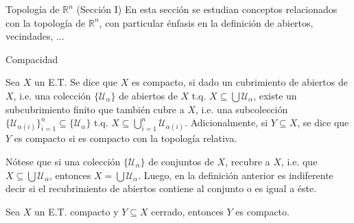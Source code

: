 \begin{chapter}{Topología de $\mathbb{R}^n$ (Sección I)}
En esta sección se estudian conceptos relacionados con la topología de $\mathbb{R}^n$, con particular énfasis en la definición de abiertos, vecindades, ...
\begin{section}{Compacidad}
\begin{defn}
Sea $X$ un E.T. Se dice que $X$ es compacto, si dado un cubrimiento de abiertos de $X$, i.e. una colección $\{\mathcal{U}_\alpha\}$ de abiertos de $X$ t.q. $X\subseteq\bigcup\mathcal{U}_\alpha$, existe un subcubrimiento finito que también cubre a $X$, i.e. una subcolección $\{\mathcal{U}_{\alpha(i)}\}_{i=1}^n\subseteq\{\mathcal{U}_\alpha\}$ t.q. $X\subseteq\bigcup_{i=1}^n\mathcal{U}_{\alpha(i)}$. Adicionalmente, si $Y\subseteq X$, se dice que $Y$ es compacto si es compacto con la topología relativa.
\end{defn}

\begin{rem}
Nótese que si una colección $\{\mathcal{U}_\alpha\}$ de conjuntos de $X$, recubre a $X$, i.e. que $X\subseteq\bigcup\mathcal{U}_\alpha$, entonces $X=\bigcup\mathcal{U}_\alpha$. Luego, en la definición anterior es indiferente decir si el recubrimiento de abiertos contiene al conjunto o es igual a éste. 
\end{rem}

\begin{them}
Sea $X$ un E.T. compacto y $Y\subseteq X$ cerrado, entonces $Y$ es compacto. 
\end{them}


\end{section}
\end{chapter}
